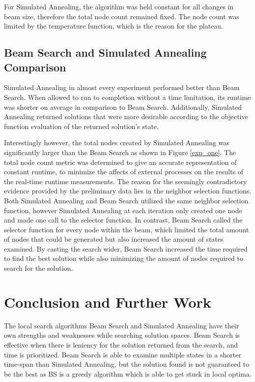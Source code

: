\documentclass[10pt, twocolumn]{article}
\begin{document}
For Simulated Annealing, the algorithm was held constant for all changes in beam size, therefore the total node count remained fixed. The node count was limited by the temperature function, which is the reason for the plateau.


\subsection{Beam Search and Simulated Annealing Comparison}

Simulated Annealing in almost every experiment performed better than Beam Search. When allowed to run to completion without a time limitation, its runtime was shorter on average in comparison to Beam Search. Additionally, Simulated Annealing returned solutions that were more desirable according to the objective function evaluation of the returned solution's state.

Interestingly however, the total nodes created by Simulated Annealing was significantly larger than the Beam Search as shown in Figure \ref{exp_one}. The total node count metric was determined to give an accurate representation of constant runtime, to minimize the affects of external processes on the results of the real-time runtime measurements. The reason for the seemingly contradictory evidence provided by the preliminary data lies in the neighbor selection functions. Both Simulated Annealing and Beam Search utilized the same neighbor selection function, however Simulated Annealing at each iteration only created one node and made one call to the selector function. In contrast, Beam Search called the selector function for every node within the beam, which limited the total amount of nodes that could be generated but also increased the amount of states examined. By casting the search wider, Beam Search increased the time required to find the best solution while also minimizing the amount of nodes required to search for the solution.

\section{Conclusion and Further Work}

The local search algorithms Beam Search and Simulated Annealing have their own strengths and weaknesses while searching solution spaces. Beam Search is effective when there is leniency for the solution returned from the search, and time is prioritized. Beam Search is able to examine multiple states in a shorter time-span than Simulated Annealing, but the solution found is not guaranteed to be the best as BS is a greedy algorithm which is able to get stuck in local optima.
\end{document}

